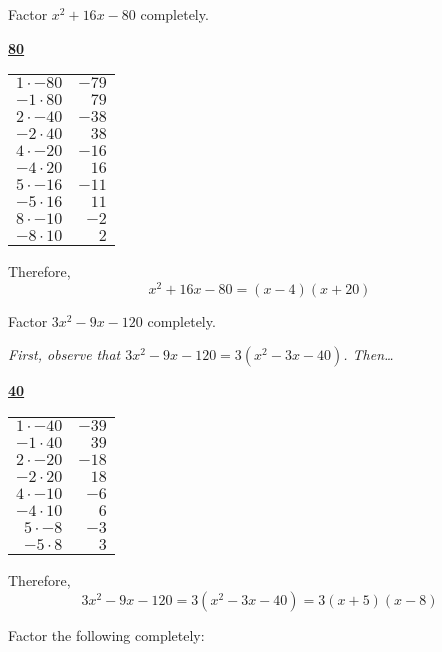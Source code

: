 \documentclass[12pt,letterpaper]{exam}
\begin{document}
\begin{questions}
\newpage
\question[10] Factor $x^2 + 16x - 80$ completely. \pspace

{\itshape
	\begin{table}[!ht]
	\centering
	\underline{\bfseries 80} \pvspace{0.2cm}
	\begin{tabular}{rr}
	$1 \cdot -80$ & $-79$ \\
	$-1 \cdot 80$ & $79$ \\
	$2 \cdot -40$ & $-38$ \\
	$-2 \cdot 40$ & $38$ \\
	$4 \cdot -20$ & $-16$ \\ \hline
	\multicolumn{1}{|r}{$-4 \cdot 20$} & \multicolumn{1}{r|}{$16$} \\ \hline
	$5 \cdot -16$ & $-11$ \\
	$-5 \cdot 16$ & $11$ \\
	$8 \cdot -10$ & $-2$ \\
	$-8 \cdot 10$ & $2$
	\end{tabular}
	\end{table}

Therefore,
	\[
	x^2 + 16x - 80= (x - 4)(x + 20)
	\] 
}



\newpage
\question[10] Factor $3x^2 - 9x - 120$ completely. \pspace

{\itshape First, observe that $3x^2 - 9x - 120= 3(x^2 - 3x - 40)$. Then\dots
	\begin{table}[!ht]
	\centering
	\underline{\bfseries 40} \pvspace{0.2cm}
	\begin{tabular}{rr}
	$1 \cdot -40$ & $-39$ \\
	$-1 \cdot 40$ & $39$ \\
	$2 \cdot -20$ & $-18$ \\
	$-2 \cdot 20$ & $18$ \\
	$4 \cdot -10$ & $-6$ \\
	$-4 \cdot 10$ & $6$ \\ \hline
	\multicolumn{1}{|r}{$5 \cdot -8$} & \multicolumn{1}{r|}{$-3$} \\ \hline
	$-5 \cdot 8$ & $3$ 
	\end{tabular}
	\end{table}

Therefore,
	\[
	3x^2 - 9x - 120= 3(x^2 - 3x - 40)= 3(x + 5)(x - 8)
	\] 
}



\newpage
\question Factor the following completely: \pspace

\begin{parts}

\end{parts}
\end{questions}
\end{document}
